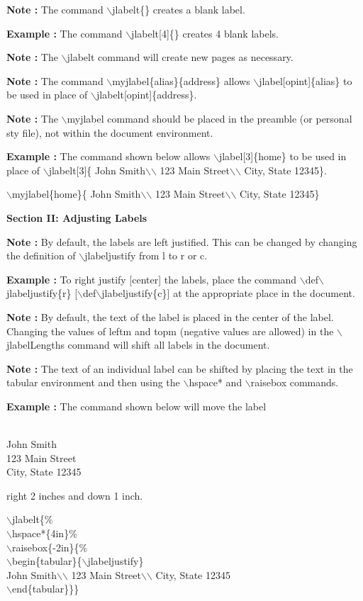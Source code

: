 \documentclass[12pt]{amsart}
\newcounter{Object}
\newcounter{SubObject}
\def\ex{\addtocounter{Object}{1}%
         {\bf Example \theObject:}
         \setcounter{SubObject}{0}}
\def\exlabeljohn{%
{ }
\parbox{87pt}{\text{ }\\
John Smith\\
123 Main Street\\
City, State 12345}
{ }}
\def\johncode{%
John Smith\(\backslash\)\(\backslash\)%
123 Main Street\(\backslash\)\(\backslash\)%
City, State 12345}
\def\note{\addtocounter{Object}{1}%
         {\bf Note \theObject:}
         \setcounter{SubObject}{0}}
\begin{document}
\note
The command
\(\backslash\)jlabelt\{\} creates a blank label.

\ex
The command
\(\backslash\)jlabelt[4]\{\} creates 4 blank labels.

\note
The \(\backslash\)jlabelt command will create new pages as necessary.

\note
The command
\(\backslash\)myjlabel\{alias\}\{address\}
allows
\(\backslash\)jlabel[opint]\{alias\}
to be used in place of
\(\backslash\)jlabelt[opint]\{address\}.

\note
The \(\backslash\)myjlabel command
should be placed in the preamble (or personal sty file),
not within the document environment.

\ex
The command shown below
allows
\(\backslash\)jlabel[3]\{home\}
to be used in place of
\(\backslash\)jlabelt[3]\{\johncode\}.

\(\backslash\)myjlabel\{home\}\{\johncode\}

\begin{center}

{\bf Section II: Adjusting Labels}

\end{center}

\note
By default, the labels are left justified.  This can
be changed by changing the definition of
\(\backslash\)jlabeljustify from l to r or c.

\ex
To right justify [center] the labels,
place the command
\(\backslash\)def\(\backslash\)jlabeljustify\{r\}
[\(\backslash\)def\(\backslash\)jlabeljustify\{c\}]
at the appropriate place in the document.

\note
By default, the text of the label is placed in the
center of the label.
Changing the values of
leftm and topm (negative values are allowed)
in the \(\backslash\)jlabelLengths command will shift
all labels in the document.

\note
The text of an individual label can be shifted by
placing the text in the tabular environment and then
using the 
\(\backslash\)hspace* and
\(\backslash\)raisebox commands.

\ex
The command shown below will
move the label
\exlabeljohn
right 2 inches and down 1 inch.

\(\backslash\)jlabelt\{\%\\
\(\backslash\)hspace*\{4in\}\%\\
\(\backslash\)raisebox\{-2in\}\{\%\\
\(\backslash\)begin\{tabular\}\{\(\backslash\)jlabeljustify\}\\
\johncode\\
\(\backslash\)end\{tabular\}\}\}
\end{document}
